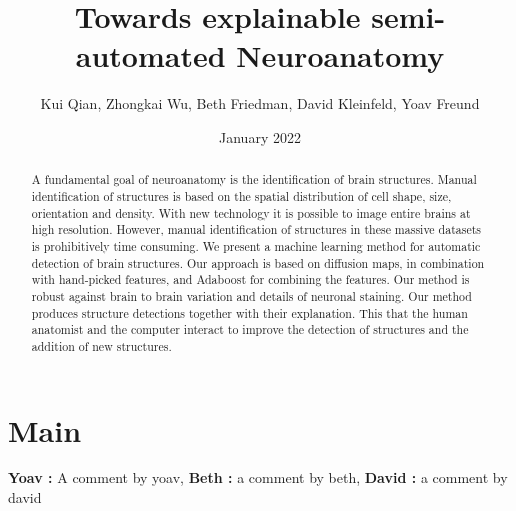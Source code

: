 \documentclass[runningheads]{llncs}
\title{Towards explainable semi-automated Neuroanatomy}
\author{Kui Qian, Zhongkai Wu, Beth Friedman, David Kleinfeld, Yoav Freund}
\date{January 2022}
\newcommand{\comment}[3]{{\color{#1} {\bf #2 :} #3}}
\newcommand{\yoav}[1]{\comment{purple}{Yoav}{#1}}
\renewcommand{\beth}[1]{\comment{red}{Beth}{#1}}
\newcommand{\david}[1]{\comment{cyan}{David}{#1}}
\begin{document}
\maketitle

\begin{abstract}
  A fundamental goal of neuroanatomy is the identification of brain
  structures.  Manual identification of structures is based on the
  spatial distribution of cell shape, size, orientation and density.
  With new technology it is possible to image entire brains at high
  resolution.  However, manual identification of structures in these
  massive datasets is prohibitively time consuming.  We present a
  machine learning method for automatic detection of brain
  structures. Our approach is based on diffusion maps, in combination
  with hand-picked features, and Adaboost for combining the
  features. Our method is robust against brain to brain variation and
  details of neuronal staining.  Our method produces structure
  detections together with their explanation. This that the human
  anatomist and the computer interact to improve the detection of
  structures and the addition of new structures.
  
\end{abstract}

\section{Main}

\yoav{A comment by yoav}, 
\beth{a comment by beth},
\david{a comment by david}
\end{document}
